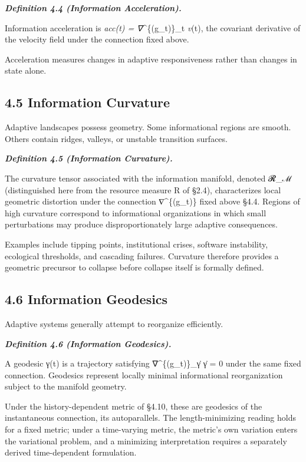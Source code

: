 \documentclass[
]{article}
\begin{document}
\emph{\textbf{Definition 4.4 (Information Acceleration).}}

Information acceleration is \emph{acc(t) = ∇}\^{}\{(g\_t)\}\_t
\emph{v}(t), the covariant derivative of the velocity field under the
connection fixed above.

Acceleration measures changes in adaptive responsiveness rather than
changes in state alone.

\hypertarget{information-curvature}{%
\subsection{4.5 Information Curvature}\label{information-curvature}}

Adaptive landscapes possess geometry. Some informational regions are
smooth. Others contain ridges, valleys, or unstable transition surfaces.

\emph{\textbf{Definition 4.5 (Information Curvature).}}

The curvature tensor associated with the information manifold, denoted
𝓡\_ℳ (distinguished here from the resource measure R of §2.4),
characterizes local geometric distortion under the connection
∇\^{}\{(g\_t)\} fixed above §4.4. Regions of high curvature correspond
to informational organizations in which small perturbations may produce
disproportionately large adaptive consequences.

Examples include tipping points, institutional crises, software
instability, ecological thresholds, and cascading failures. Curvature
therefore provides a geometric precursor to collapse before collapse
itself is formally defined.

\hypertarget{information-geodesics}{%
\subsection{4.6 Information Geodesics}\label{information-geodesics}}

Adaptive systems generally attempt to reorganize efficiently.

\emph{\textbf{Definition 4.6 (Information Geodesics).}}

A geodesic γ(t) is a trajectory satisfying ∇\^{}\{(g\_t)\}\_γ̇ γ̇ = 0
under the same fixed connection. Geodesics represent locally minimal
informational reorganization subject to the manifold geometry.

Under the history-dependent metric of §4.10, these are geodesics of the
instantaneous connection, its autoparallels. The length-minimizing
reading holds for a fixed metric; under a time-varying metric, the
metric's own variation enters the variational problem, and a minimizing
interpretation requires a separately derived time-dependent formulation.
\end{document}
